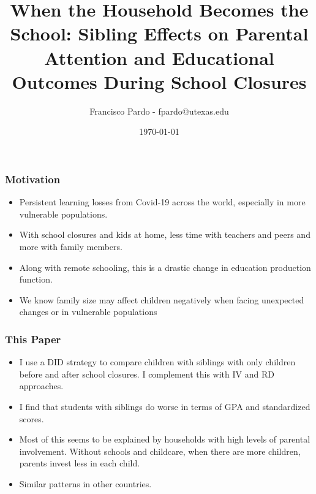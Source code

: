 \documentclass{beamer}
\title[]{When the Household Becomes the School: Sibling Effects on Parental Attention and Educational Outcomes During School Closures}
\author[Francisco Pardo] %
{Francisco Pardo - fpardo@utexas.edu \inst{1}}
\institute[UT] %
{
  \inst{1}%
  University of Texas at Austin
}
\date{\today}
\begin{document}
\frame{\titlepage}


\begin{frame}[t]
    \label{frame:motivation}
    \frametitle{Motivation}

    
    \begin{itemize}
        \item Persistent learning losses from Covid-19 across the world, especially in more vulnerable populations. %
        \item With school closures and kids at home, less time with teachers and peers and more with family members.
        \item Along with remote schooling, this is a drastic change in education production function.
        \item We know family size may affect children negatively when facing unexpected changes or in vulnerable populations
        
    \end{itemize}
    
\end{frame}





\begin{frame}
    \label{frame:thispaper}
    \frametitle{This Paper}
    \begin{itemize}
    \item I use a DID strategy to compare children with siblings with only children before and after school closures. I complement this with IV and RD approaches.
    \item I find that students with siblings do  worse in terms of GPA and standardized scores. 
    \item Most of this seems to be explained by households with high levels of parental involvement. Without schools and childcare, when there are more children, parents invest less in each child.
    \item Similar patterns in other countries.
    \end{itemize}
\end{frame}
\end{document}
